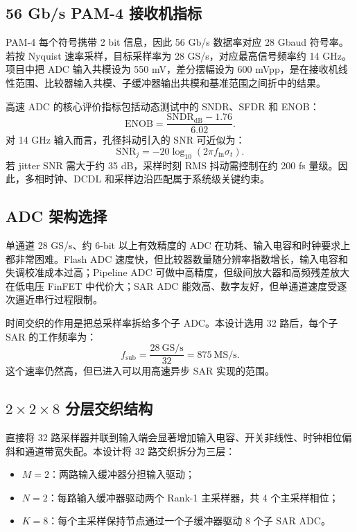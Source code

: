\documentclass[UTF8,zihao=-4]{ctexart}
\begin{document}
\subsection{56 Gb/s PAM-4 接收机指标}

PAM-4 每个符号携带 2 bit 信息，因此 56 Gb/s 数据率对应 28 Gbaud 符号率。若按 Nyquist 速率采样，目标采样率为 28 GS/s，对应最高信号频率约 14 GHz。项目中把 ADC 输入共模设为 550 mV，差分摆幅设为 600 mVpp，是在接收机线性范围、比较器输入共模、子缓冲器输出共模和基准范围之间折中的结果。

高速 ADC 的核心评价指标包括动态测试中的 SNDR、SFDR 和 ENOB：
\[
  \mathrm{ENOB}=\frac{\mathrm{SNDR}_{\mathrm{dB}}-1.76}{6.02}.
\]
对 14 GHz 输入而言，孔径抖动引入的 SNR 可近似为：
\[
  \mathrm{SNR}_j=-20\log_{10}(2\pi f_{\mathrm{in}}\sigma_t).
\]
若 jitter SNR 需大于约 35 dB，采样时刻 RMS 抖动需控制在约 200 fs 量级。因此，多相时钟、DCDL 和采样边沿匹配属于系统级关键约束。

\subsection{ADC 架构选择}

单通道 28 GS/s、约 6-bit 以上有效精度的 ADC 在功耗、输入电容和时钟要求上都非常困难。Flash ADC 速度快，但比较器数量随分辨率指数增长，输入电容和失调校准成本过高；Pipeline ADC 可做中高精度，但级间放大器和高频残差放大在低电压 FinFET 中代价大；SAR ADC 能效高、数字友好，但单通道速度受逐次逼近串行过程限制。

时间交织的作用是把总采样率拆给多个子 ADC。本设计选用 32 路后，每个子 SAR 的工作频率为：
\[
  f_{\mathrm{sub}}=\frac{28~\mathrm{GS/s}}{32}=875~\mathrm{MS/s}.
\]
这个速率仍然高，但已进入可以用高速异步 SAR 实现的范围。

\subsection{\texorpdfstring{\(2 \times 2 \times 8\)}{2 x 2 x 8} 分层交织结构}

直接将 32 路采样器并联到输入端会显著增加输入电容、开关非线性、时钟相位偏斜和通道带宽失配。本设计将 32 路交织拆分为三层：
\begin{itemize}
  \item \(M=2\)：两路输入缓冲器分担输入驱动；
  \item \(N=2\)：每路输入缓冲器驱动两个 Rank-1 主采样器，共 4 个主采样相位；
  \item \(K=8\)：每个主采样保持节点通过一个子缓冲器驱动 8 个子 SAR ADC。
\end{itemize}
\end{document}
